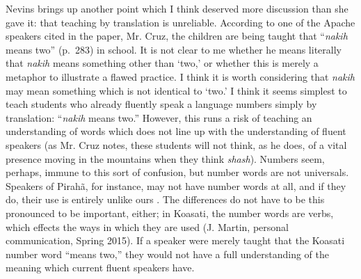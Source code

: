 \documentclass[man,12pt,natbib]{apa6}
\begin{document}
Nevins brings up another point which I think deserved more discussion than she
gave it: that teaching by translation is unreliable. According to one of the
Apache speakers cited in the paper, Mr. Cruz, the children are being taught
that ``\emph{nakih} means two'' (p.~283) in school. It is not clear to me
whether he means literally that \emph{nakih} means something other than `two,'
or whether this is merely a metaphor to illustrate a flawed practice. I think
it is worth considering that \emph{nakih} may mean something which is not
identical to `two.' I think it seems simplest to teach students who already
fluently speak a language numbers simply by translation: ``\emph{nakih} means
two.'' However, this runs a risk of teaching an understanding of words which 
does not line up with the understanding of fluent speakers (as Mr. Cruz notes,
these students will not think, as he does, of a vital presence moving in the
mountains when they think \emph{shash}). Numbers seem, perhaps, immune to this
sort of confusion, but number words are not universals. Speakers of Pirah\~{a},
for instance, may not have number words at all, and if they do, their use is
entirely unlike ours \citep{Gordon04,Frank08,Everett12}. The differences do not
have to be this pronounced to be important, either; in Koasati, the number
words are verbs, which effects the ways in which they are used (J. Martin,
personal communication, Spring 2015). If a speaker were merely taught that the
Koasati number word ``means two,'' they would not have a full understanding of
the meaning which current fluent speakers have.


\clearpage

\end{document}
